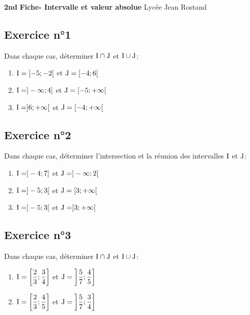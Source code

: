 \documentclass[12pt,a4paper]{article}
\begin{document}
\textbf{2nd} \hfill \textbf{Fiche- Intervalle et valeur absolue } \hfill Lycée Jean Rostand\\
\trait 

\subsection*{Exercice n°1}
 Dans chaque cas, déterminer $\rm I\cap J$ et $\rm I\cup J$:
 
 \begin{enumerate}
     \item $\rm I=[-5;-2[$ et $\rm J=[-4;6[$
     \item  $\rm I=]-\infty;4]$ et $\rm J=[-5;+\infty[$
     \item $\rm I=]6;+\infty[$ et $\rm J=[-4;+\infty[$
 \end{enumerate}
          
\subsection*{Exercice n°2}

 Dans chaque cas, déterminer l'intersection et la réunion des intervalles $\rm I$ et $\rm J$:
 
 \begin{enumerate}
     \item $\rm I=]-4;7]$ et $\rm J=]-\infty;2[$
     \item $\rm I=]-5;3[$ et $\rm J=[3;+\infty[$
     \item $\rm I=]-5;3[$ et $\rm J=]3;+\infty[$

\end{enumerate}
\subsection*{Exercice n°3}

  Dans chaque cas, déterminer $\rm I\cap J$ et $\rm I\cup J$:
  
\begin{enumerate} 
\item $\displaystyle\rm I=\left[\frac 23;\frac 34\right]$ et $\displaystyle\rm J=\left]\frac
                57;\frac 45\right]$
                
\item $\displaystyle\rm I=\left[\frac 23;\frac 45\right]$ et $\displaystyle\rm J=\left]\frac
                57;\frac 34\right]$

\end{enumerate} 
\end{document}
